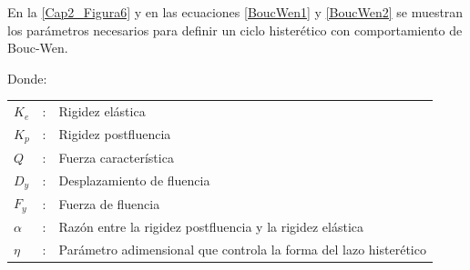 En la \autoref{Cap2_Figura6} y en las ecuaciones \ref{BoucWen1} y \ref{BoucWen2} se muestran los parámetros necesarios para definir un ciclo histerético con comportamiento de Bouc-Wen.

Donde:

\begin{tabular}{L{0.5 cm}p{0.025 cm}p{11.5 cm}}
  $K_{e}$ & : & Rigidez elástica \\
  $K_{p}$ & : & Rigidez postfluencia \\
  $Q$     & : & Fuerza característica \\
  $D_{y}$ & : & Desplazamiento de fluencia \\
  $F_{y}$ & : & Fuerza de fluencia \\
  $\alpha$ & : & Razón entre la rigidez postfluencia y la rigidez elástica  \\
  $\eta$ & : & Parámetro adimensional que controla la forma del lazo histerético \\
 \end{tabular}\\

	
 
 